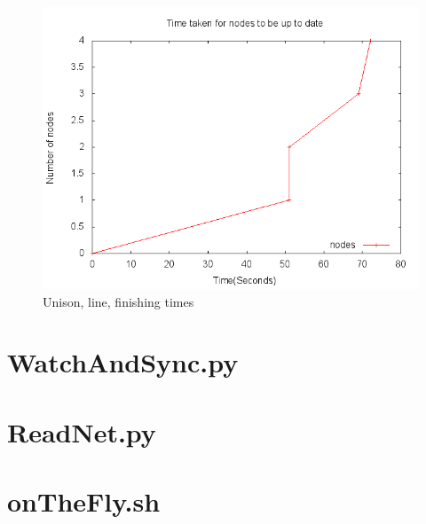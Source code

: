 \documentclass[12pt]{article}
\begin{document}
\appendix

\begin{figure}[htp]
    \centering
    \includegraphics[scale=0.5]{images/fintime.png}
    \caption{Unison, line, finishing times}
    \label{fig:fintime_graph}
\end{figure}

\section{WatchAndSync.py}


\section{ReadNet.py}


\section{onTheFly.sh}

\end{document}
